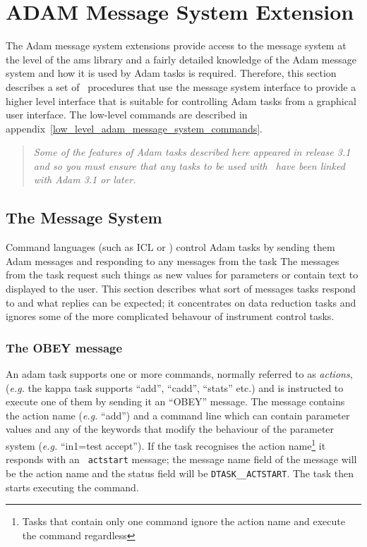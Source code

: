 \section{\label{adam_message_system_extension}ADAM Message System Extension}

The Adam message system extensions provide access to the message system
at the level of the ams library and a fairly detailed knowledge
of the Adam message system and how it is used by Adam tasks is required.
Therefore, this section describes a set of \Tcl\ procedures that use the
message system interface to provide a higher level interface that is
suitable for controlling Adam tasks from a graphical user interface. The
low-level commands are described in
appendix~\ref{low_level_adam_message_system_commands}.

\begin{quote}
{\em Some of the features of Adam tasks described here appeared in release
3.1 and so you must ensure that any tasks to be used with \Tcl\ have been
linked with Adam 3.1 or later.}
\end{quote}

\subsection{\label{message_system}The Message System}

Command languages (such as ICL or \TclTk ) control Adam tasks by
sending them Adam messages and responding to any messages from the task
The messages from the task request such things as new values for
parameters or contain text to displayed to the user.  This section
describes what sort of messages tasks respond to and what replies can
be expected; it concentrates on data reduction tasks and ignores some
of the more complicated behavour of instrument control tasks.

\subsubsection{The OBEY message}

An adam task supports one or more commands, normally referred to as
{\em actions}, ({\em{e.g.}} the kappa task supports ``add'', ``cadd'',
``stats'' etc.) and is instructed to execute one of them by sending it
an ``OBEY'' message. The message contains the action name ({\em{e.g.}} ``add'')
and a command line which can contain parameter values and any of the
keywords that modify the behaviour of the parameter system ({\em{e.g.}}
``in1=test accept''). If the task recognises the action
name\footnote{Tasks that contain only one command ignore the action
name and execute the command regardless} it responds with an {\tt
actstart} message; the message name field of the message will be the
action name and the status field will be {\tt DTASK\_\_ACTSTART}. The
task then starts executing the command.

